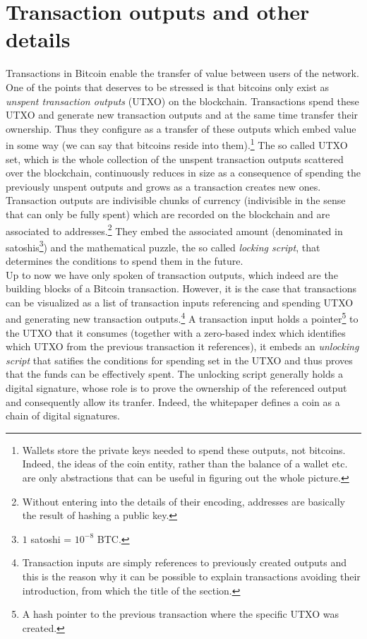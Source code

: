 \section{Transaction outputs and other details}
\label{sec::tx_out}
Transactions in Bitcoin enable the transfer of value between users of the network. One of the points that deserves to be stressed is that bitcoins only exist as \textit{unspent transaction outputs} (UTXO) on the blockchain. Transactions spend these UTXO and generate new transaction outputs and at the same time transfer their ownership. Thus they configure as a transfer of these outputs which embed value in some way (we can say that bitcoins reside into them).\footnote{Wallets store the private keys needed to spend these outputs, not bitcoins. Indeed, the ideas of the coin entity, rather than the balance of a wallet etc. are only abstractions that can be useful in figuring out the whole picture.} The so called UTXO set, which is the whole collection of the unspent transaction outputs scattered over the blockchain, continuously reduces in size as a consequence of spending the previously unspent outputs and grows as a transaction creates new ones.\\
Transaction outputs are indivisible chunks of currency (indivisible in the sense that can only be fully spent) which are recorded on the blockchain and are associated to addresses.\footnote{Without entering into the details of their encoding, addresses are basically the result of hashing a public key.} They embed the associated amount (denominated in satoshis\footnote{$1$ satoshi = $10^{-8}$ BTC.}) and the mathematical puzzle, the so called \textit{locking script}, that determines the conditions to spend them in the future.\\
Up to now we have only spoken of transaction outputs, which indeed are the building blocks of a Bitcoin transaction. However, it is the case that transactions can be visualized as a list of transaction inputs referencing and spending UTXO and generating new transaction outputs.\footnote{Transaction inputs are simply references to previously created outputs and this is the reason why it can be possible to explain transactions avoiding their introduction, from which the title of the section.} A transaction input holds a pointer\footnote{A hash pointer to the previous transaction where the specific UTXO was created.} to the UTXO that it consumes (together with a zero-based index which identifies which UTXO from the previous transaction it references), it embeds an \textit{unlocking script} that satifies the conditions for spending set in the UTXO and thus proves that the funds can be effectively spent. The unlocking script generally holds a digital signature, whose role is to prove the ownership of the referenced output and consequently allow its tranfer. Indeed, the whitepaper \cite{Nakamoto_bitcoin:a} defines a coin as a chain of digital signatures.\\
